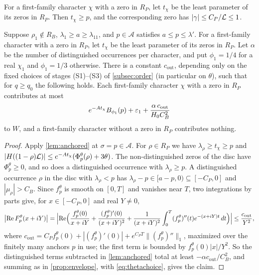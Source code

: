 For a first-family character $\chi$ with a zero in $R_P$, let $t_\chi$ be the least parameter of
its zeros in $R_P$. Then $t_\chi\ge p$, and the corresponding zero has $|\gamma|\le C_P/\LL\le1$.

\begin{proposition}\label{prop:firstoutside}
Suppose $\rho_1\notin R_B$, $\lambda_1\ge a\ge\lambda_{11}$, and
$p\in\mathcal A$ satisfies $a\le p\le\lambda'$. For a first-family character with a
zero in $R_P$, let $t_\chi$ be the least parameter of its zeros in $R_P$.
Let $\alpha$ be the number of distinguished occurrences per character, and put
$\phi_1=1/4$ for a real $\chi_1$ and $\phi_1=1/3$ otherwise.
There is a constant $c_{\mathrm{out}}$, depending only on the fixed choices of stages (S1)--(S3) of
\cref{subsec:order} (in particular on $\theta$), such that for $q\ge q_0$ the following holds. Each
first-family character $\chi$ with a zero in $R_P$ contributes at most
\[
  e^{-At_\chi}B_{\phi_1}(p)+\eps_1+\frac{\alpha\,c_{\mathrm{out}}}{H_0C_B^2}
\]
to $W$, and a first-family character without a zero in $R_P$ contributes nothing.
\end{proposition}

\begin{proof}
Apply \cref{lem:anchored} at $\sigma=p\in\mathcal A$. For $\rho\in R_P$ we have $\lambda_\rho\ge t_\chi\ge p$ and
$|H((1-\rho)\LL)|\le e^{-At_\chi}(\Phi^\theta_p(\rho)+3\theta)$. The non-distinguished zeros of the disc
have $\Phi^\theta_p\ge0$, and so does a distinguished occurrence with $\lambda_\rho\ge p$. A distinguished
occurrence $\rho$ in the disc with $\lambda_\rho<p$ has $\lambda_\rho-p\in[a-p,0)\subseteq[-C_P,0]$ and
$|\mu_\rho|>C_B$. Since $f^\theta_p$ is smooth on $[0,T]$ and vanishes near $T$, two integrations
by parts give, for $x\in[-C_P,0]$ and real $Y\ne0$,
\[
  \bigl|\Re F^\theta_p(x+iY)\bigr|=\Bigl|\Re\Bigl(\frac{f^\theta_p(0)}{x+iY}+\frac{(f^\theta_p)'(0)}{(x+iY)^2}
  +\frac1{(x+iY)^2}\int_0^T(f^\theta_p)''(t)e^{-(x+iY)t}\,dt\Bigr)\Bigr|\le\frac{c_{\mathrm{out}}}{Y^2},
\]
where $c_{\mathrm{out}}=C_Pf^\theta_p(0)+|(f^\theta_p)'(0)|+e^{C_PT}\|(f^\theta_p)''\|_1$, maximized over the
finitely many anchors $p$ in use; the first term is bounded by $f^\theta_p(0)|x|/Y^2$. So the
distinguished terms subtracted in \cref{lem:anchored} total at least $-\alpha c_{\mathrm{out}}/C_B^2$,
and summing as in \cref{prop:envelope}, with \eqref{eq:thetachoice}, gives the claim.
\end{proof}

